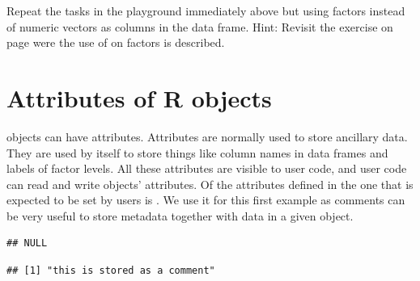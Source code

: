 \documentclass[krantz2]{krantz}\usepackage{knitr}%
\begin{document}
\begin{advplayground}
Repeat the tasks in the playground immediately above but using factors instead of numeric vectors as columns in the data frame. Hint: Revisit the exercise on page \pageref{calc:ADVPG:order:sort} were the use of  on factors is described.
\end{advplayground}




\section{Attributes of R objects}\label{sec:calc:attributes}

\Rlang objects can have attributes. Attributes are normally used to store ancillary data. They are used by \Rlang itself to store things like column names in data frames and labels of factor levels. All these attributes are visible to user code, and user code can read and write objects' attributes. Of the attributes defined in \Rlang the one that is expected to be set by users is . We use it for this first example as comments can be very useful to store metadata together with data in a given object.

\begin{knitrout}\footnotesize
{}\color{fgcolor}\begin{kframe}
\begin{alltt}
 \hlkwb{<-} \hlstd{(} \hlstd{=} \hlopt{:}\hlstd{,}  \hlstd{=} \hlstd{,}  \hlstd{=} \hlstd{(}\hlstd{,} \hlstd{))}
\end{alltt}
\begin{verbatim}
## NULL
\end{verbatim}
\begin{alltt}
 \hlkwb{<-} 
\end{alltt}
\begin{verbatim}
## [1] "this is stored as a comment"
\end{verbatim}
\end{kframe}
\end{knitrout}
\end{document}
